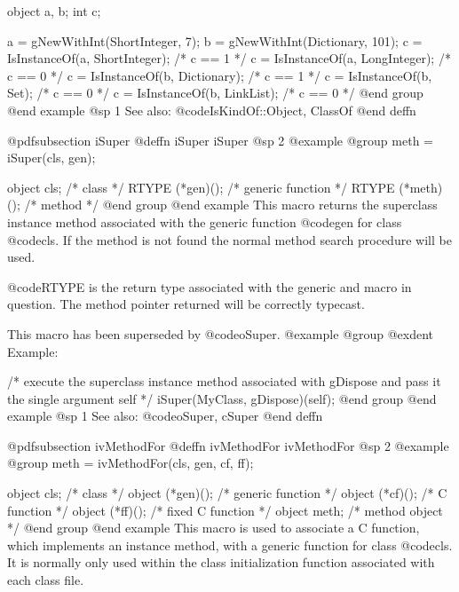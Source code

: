 {{{{object  a, b;
int     c;

a = gNewWithInt(ShortInteger, 7);
b = gNewWithInt(Dictionary, 101);
c = IsInstanceOf(a, ShortInteger);  /* c == 1  */
c = IsInstanceOf(a, LongInteger);   /* c == 0  */
c = IsInstanceOf(b, Dictionary);    /* c == 1  */
c = IsInstanceOf(b, Set);           /* c == 0  */
c = IsInstanceOf(b, LinkList);      /* c == 0  */
@end group
@end example
@sp 1
See also:  @code{IsKindOf::Object, ClassOf}
@end deffn










@pdfsubsection {iSuper}
@deffn {iSuper} iSuper
@sp 2
@example
@group
meth = iSuper(cls, gen);

object  cls;            /*  class               */
RTYPE   (*gen)();       /*  generic function    */
RTYPE   (*meth)();      /*  method              */
@end group
@end example
This macro returns the superclass instance method associated with the
generic function @code{gen} for class @code{cls}.  If the method is not
found the normal method search procedure will be used.

@code{RTYPE} is the return type associated with the generic and
macro in question.  The method pointer returned will be correctly
typecast.

This macro has been superseded by @code{oSuper}.
@example
@group
@exdent Example:

 /* execute the superclass instance
    method associated with gDispose
    and pass it the single argument self  */
iSuper(MyClass, gDispose)(self);
@end group
@end example
@sp 1
See also:  @code{oSuper, cSuper}
@end deffn











@pdfsubsection {ivMethodFor}
@deffn {ivMethodFor} ivMethodFor
@sp 2
@example
@group
meth = ivMethodFor(cls, gen, cf, ff);

object  cls;            /*  class               */
object  (*gen)();       /*  generic function    */
object  (*cf)();        /*  C function          */
object  (*ff)();        /*  fixed C function    */
object  meth;           /*  method object       */
@end group
@end example
This macro is used to associate a C function, which implements an
instance method, with a generic function for class @code{cls}.  It is
normally only used within the class initialization function associated
with each class file.

}}}}
